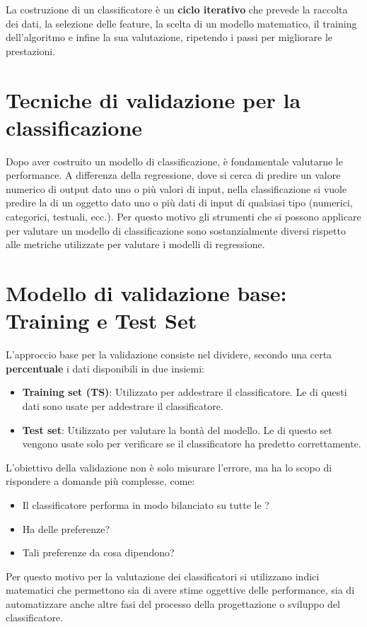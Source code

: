 La costruzione di un classificatore è un \textbf{ciclo
iterativo} che prevede la raccolta dei dati, la selezione
delle feature, la scelta di un modello matematico, il
training dell'algoritmo e infine la sua valutazione,
ripetendo i passi per migliorare le prestazioni.




\section{Tecniche di validazione per la classificazione}

Dopo aver costruito un modello di classificazione, è fondamentale valutarne le
performance. A differenza della regressione, dove si cerca di predire un
valore numerico di output dato uno o più valori di input, nella
classificazione si vuole predire la  di un oggetto dato uno o più
dati di input di qualsiasi tipo (numerici, categorici, testuali, ecc.).
Per questo motivo gli strumenti che si possono applicare per valutare un modello di
classificazione sono sostanzialmente diversi rispetto alle metriche utilizzate
per valutare i modelli di regressione.

\section{Modello di validazione base: Training e Test Set}

L'approccio base per la validazione consiste nel dividere, secondo una certa
\textbf{percentuale} i dati disponibili in due insiemi:

\begin{itemize}
    \item \textbf{Training set (TS)}: Utilizzato per addestrare il
    classificatore. Le  di questi dati sono usate per
    addestrare il classificatore.
    \item \textbf{Test set}: Utilizzato per valutare la bontà del modello.
    Le  di questo set vengono usate solo per verificare se
    il classificatore ha predetto correttamente.
\end{itemize}

L'obiettivo della validazione non è solo misurare l'errore, ma ha lo scopo di
rispondere a domande più complesse, come:
\begin{itemize}
    \item Il classificatore performa in modo bilanciato su tutte le ?
    \item Ha delle preferenze?
    \item Tali preferenze da cosa dipendono?
\end{itemize}
Per questo motivo per la valutazione dei classificatori si utilizzano indici
matematici che permettono sia di avere stime oggettive delle performance, sia
di automatizzare anche altre fasi del processo della progettazione o sviluppo
del classificatore.

